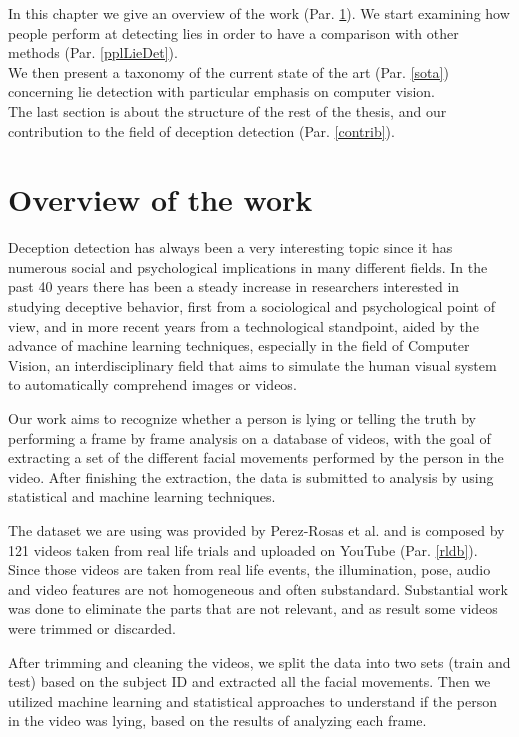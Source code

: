 In this chapter we give an overview of the work (Par. \ref{overview}). We start examining how people perform at detecting lies in order to have a comparison with other methods (Par. \ref{pplLieDet}). \\
We then present a taxonomy of the current state of the art (Par. \ref{sota}) concerning lie detection with particular emphasis on computer vision. \\
The last section is about the structure of the rest of the thesis, and our contribution to the field of deception detection (Par. \ref{contrib}).

\section{Overview of the work} \label{overview}
Deception detection has always been a very interesting topic since it has numerous social and psychological implications in many different fields. In the past 40 years there has been a steady increase in researchers interested in studying deceptive behavior, first from a sociological and psychological point of view, and in more recent years from a technological standpoint, aided by the advance of machine learning techniques, especially in the field of Computer Vision, an interdisciplinary field that aims to simulate the human visual system to automatically comprehend images or videos.

Our work aims to recognize whether a person is lying or telling the truth by performing a frame by frame analysis on a database of videos, with the goal of extracting a set of the different facial movements performed by the person in the video. After finishing the extraction, the data is submitted to analysis by using statistical and machine learning techniques.

The dataset we are using was provided by Perez-Rosas et al. \cite{Perez-Rosas:2015:DDU:2818346.2820758} and is composed by 121 videos taken from real life trials and uploaded on YouTube (Par. \ref{rldb}). Since those videos are taken from real life events, the illumination, pose, audio and video features are not homogeneous and often substandard. Substantial work was done to eliminate the parts that are not relevant, and as result some videos were trimmed or discarded.

After trimming and cleaning the videos, we split the data into two sets (train and test) based on the subject ID and extracted all the facial movements. Then we utilized machine learning and statistical approaches to understand if the person in the video was lying, based on the results of analyzing each frame.

